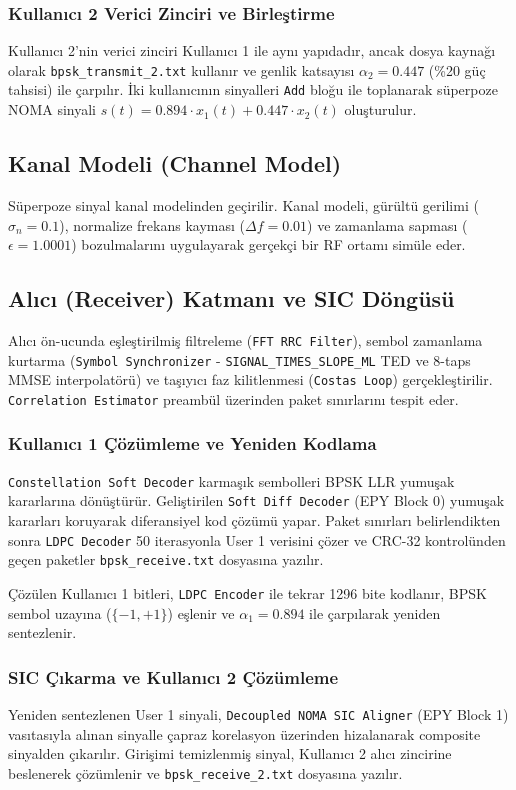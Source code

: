 \subsubsection{Kullanıcı 2 Verici Zinciri ve Birleştirme}
Kullanıcı 2'nin verici zinciri Kullanıcı 1 ile aynı yapıdadır, ancak dosya kaynağı olarak \texttt{bpsk\_transmit\_2.txt} kullanır ve genlik katsayısı $\alpha_2 = 0.447$ (\%20 güç tahsisi) ile çarpılır. İki kullanıcının sinyalleri \texttt{Add} bloğu ile toplanarak süperpoze NOMA sinyali $s(t) = 0.894 \cdot x_1(t) + 0.447 \cdot x_2(t)$ oluşturulur.

\subsection{Kanal Modeli (Channel Model)}
Süperpoze sinyal kanal modelinden geçirilir. Kanal modeli, gürültü gerilimi ($\sigma_n = 0.1$), normalize frekans kayması ($\Delta f = 0.01$) ve zamanlama sapması ($\epsilon = 1.0001$) bozulmalarını uygulayarak gerçekçi bir RF ortamı simüle eder.

\subsection{Alıcı (Receiver) Katmanı ve SIC Döngüsü}
Alıcı ön-ucunda eşleştirilmiş filtreleme (\texttt{FFT RRC Filter}), sembol zamanlama kurtarma (\texttt{Symbol Synchronizer} - \texttt{SIGNAL\_TIMES\_SLOPE\_ML} TED ve 8-taps MMSE interpolatörü) ve taşıyıcı faz kilitlenmesi (\texttt{Costas Loop}) gerçekleştirilir. \texttt{Correlation Estimator} preambül üzerinden paket sınırlarını tespit eder.

\subsubsection{Kullanıcı 1 Çözümleme ve Yeniden Kodlama}
\texttt{Constellation Soft Decoder} karmaşık sembolleri BPSK LLR yumuşak kararlarına dönüştürür. Geliştirilen \texttt{Soft Diff Decoder} (EPY Block 0) yumuşak kararları koruyarak diferansiyel kod çözümü yapar. Paket sınırları belirlendikten sonra \texttt{LDPC Decoder} 50 iterasyonla User 1 verisini çözer ve CRC-32 kontrolünden geçen paketler \texttt{bpsk\_receive.txt} dosyasına yazılır.

Çözülen Kullanıcı 1 bitleri, \texttt{LDPC Encoder} ile tekrar 1296 bite kodlanır, BPSK sembol uzayına ($\{-1, +1\}$) eşlenir ve $\alpha_1 = 0.894$ ile çarpılarak yeniden sentezlenir.

\subsubsection{SIC Çıkarma ve Kullanıcı 2 Çözümleme}
Yeniden sentezlenen User 1 sinyali, \texttt{Decoupled NOMA SIC Aligner} (EPY Block 1) vasıtasıyla alınan sinyalle çapraz korelasyon üzerinden hizalanarak composite sinyalden çıkarılır. Girişimi temizlenmiş sinyal, Kullanıcı 2 alıcı zincirine beslenerek çözümlenir ve \texttt{bpsk\_receive\_2.txt} dosyasına yazılır.

